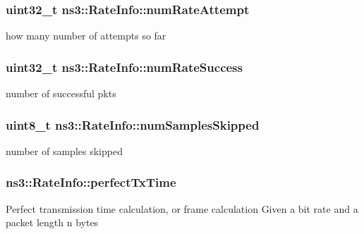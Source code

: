 \subsubsection[{\texorpdfstring{num\+Rate\+Attempt}{numRateAttempt}}]{\setlength{\rightskip}{0pt plus 5cm}uint32\+\_\+t ns3\+::\+Rate\+Info\+::num\+Rate\+Attempt}\hypertarget{structns3_1_1RateInfo_ae8433a0b621c573647865b57fc50e29b}{}\label{structns3_1_1RateInfo_ae8433a0b621c573647865b57fc50e29b}


how many number of attempts so far 

\subsubsection[{\texorpdfstring{num\+Rate\+Success}{numRateSuccess}}]{\setlength{\rightskip}{0pt plus 5cm}uint32\+\_\+t ns3\+::\+Rate\+Info\+::num\+Rate\+Success}\hypertarget{structns3_1_1RateInfo_a2d4553b391255bb5a7fc2ba9767bd582}{}\label{structns3_1_1RateInfo_a2d4553b391255bb5a7fc2ba9767bd582}


number of successful pkts 

\subsubsection[{\texorpdfstring{num\+Samples\+Skipped}{numSamplesSkipped}}]{\setlength{\rightskip}{0pt plus 5cm}uint8\+\_\+t ns3\+::\+Rate\+Info\+::num\+Samples\+Skipped}\hypertarget{structns3_1_1RateInfo_a0f6575fc7210a909c7608ea5d837d41b}{}\label{structns3_1_1RateInfo_a0f6575fc7210a909c7608ea5d837d41b}


number of samples skipped 

\subsubsection[{\texorpdfstring{perfect\+Tx\+Time}{perfectTxTime}}]{ ns3\+::\+Rate\+Info\+::perfect\+Tx\+Time}\hypertarget{structns3_1_1RateInfo_ac23dffcf7383a1adaadc94bb0391c86a}{}\label{structns3_1_1RateInfo_ac23dffcf7383a1adaadc94bb0391c86a}
Perfect transmission time calculation, or frame calculation Given a bit rate and a packet length n bytes 
